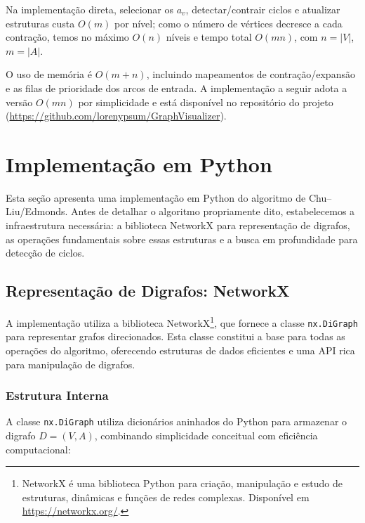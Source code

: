Na implementação direta, selecionar os \(a_v\), detectar/contrair ciclos e atualizar estruturas custa \(O(m)\) por nível; como o número de vértices decresce a cada contração, temos no máximo \(O(n)\) níveis e tempo total \(O(mn)\), com \(n=|V|\), \(m=|A|\).



O uso de memória é \(O(m+n)\), incluindo mapeamentos de contração/expansão e as filas de prioridade dos arcos de entrada. A implementação a seguir adota a versão \(O(mn)\) por simplicidade e está disponível no repositório do projeto (\url{https://github.com/lorenypsum/GraphVisualizer}).

\section{Implementação em Python}

Esta seção apresenta uma implementação em Python do algoritmo de Chu--Liu/Edmonds. Antes de detalhar o algoritmo propriamente dito, estabelecemos a infraestrutura necessária: a biblioteca NetworkX para representação de digrafos, as operações fundamentais sobre essas estruturas e a busca em profundidade para detecção de ciclos.

\subsection{Representação de Digrafos: NetworkX}

A implementação utiliza a biblioteca NetworkX\footnote{NetworkX é uma biblioteca Python para criação, manipulação e estudo de estruturas, dinâmicas e funções de redes complexas. Disponível em \url{https://networkx.org/}.}, que fornece a classe \texttt{nx.DiGraph} para representar grafos direcionados. Esta classe constitui a base para todas as operações do algoritmo, oferecendo estruturas de dados eficientes e uma API rica para manipulação de digrafos.

\subsubsection{Estrutura Interna}

A classe \texttt{nx.DiGraph} utiliza dicionários aninhados do Python para armazenar o digrafo \(D=(V,A)\), combinando simplicidade conceitual com eficiência computacional:

